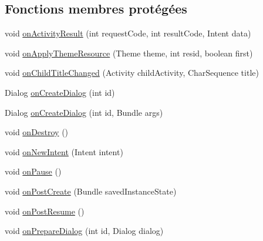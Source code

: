 \subsection*{Fonctions membres protégées}
\begin{DoxyCompactItemize}
\item 
void \hyperlink{classorg_1_1qtproject_1_1qt5_1_1android_1_1bindings_1_1_qt_activity_a4e9a7c6b28384e4d5f713462207ffc41}{on\-Activity\-Result} (int request\-Code, int result\-Code, Intent data)
\item 
void \hyperlink{classorg_1_1qtproject_1_1qt5_1_1android_1_1bindings_1_1_qt_activity_acd279279e5ad448d802fa31b64a30aef}{on\-Apply\-Theme\-Resource} (Theme theme, int resid, boolean first)
\item 
void \hyperlink{classorg_1_1qtproject_1_1qt5_1_1android_1_1bindings_1_1_qt_activity_ac300f488c368a77573a3ecbf90f88b3c}{on\-Child\-Title\-Changed} (Activity child\-Activity, Char\-Sequence title)
\item 
Dialog \hyperlink{classorg_1_1qtproject_1_1qt5_1_1android_1_1bindings_1_1_qt_activity_a94b7cad79823109fd5ce75385766144b}{on\-Create\-Dialog} (int id)
\item 
Dialog \hyperlink{classorg_1_1qtproject_1_1qt5_1_1android_1_1bindings_1_1_qt_activity_a68654d4382feda0419fd1a59792b3643}{on\-Create\-Dialog} (int id, Bundle args)
\item 
void \hyperlink{classorg_1_1qtproject_1_1qt5_1_1android_1_1bindings_1_1_qt_activity_a30832553da49ca0dea222e062e21710c}{on\-Destroy} ()
\item 
void \hyperlink{classorg_1_1qtproject_1_1qt5_1_1android_1_1bindings_1_1_qt_activity_a995502b7cf803efcecc91d345b030404}{on\-New\-Intent} (Intent intent)
\item 
void \hyperlink{classorg_1_1qtproject_1_1qt5_1_1android_1_1bindings_1_1_qt_activity_a54af4563a2a1f3ea73187c2e9b9b042c}{on\-Pause} ()
\item 
void \hyperlink{classorg_1_1qtproject_1_1qt5_1_1android_1_1bindings_1_1_qt_activity_a1a206c815af224d5bf06e5c921f4fdd4}{on\-Post\-Create} (Bundle saved\-Instance\-State)
\item 
void \hyperlink{classorg_1_1qtproject_1_1qt5_1_1android_1_1bindings_1_1_qt_activity_af23189d66db86a4a4356af8481450fa1}{on\-Post\-Resume} ()
\item 
void \hyperlink{classorg_1_1qtproject_1_1qt5_1_1android_1_1bindings_1_1_qt_activity_a7c23883f7117af2b20250150e032935d}{on\-Prepare\-Dialog} (int id, Dialog dialog)
\item 

\end{DoxyCompactItemize}
